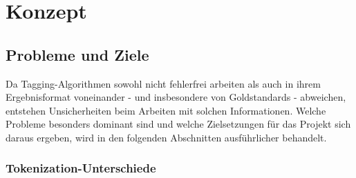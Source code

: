 %
\chapter{Konzept}
\label{sec:concept}






\section{Probleme und Ziele}
\label{sec:general:goals}

Da Tagging-Algorithmen sowohl nicht fehlerfrei arbeiten als auch in ihrem Ergebnisformat voneinander - und insbesondere von Goldstandards - abweichen, entstehen Unsicherheiten beim Arbeiten mit solchen Informationen. Welche Probleme besonders dominant sind und welche Zielsetzungen für das Projekt sich daraus ergeben, wird in den folgenden Abschnitten ausführlicher behandelt.

\subsection{Tokenization-Unterschiede}
\label{sec:general:goals:tok}

